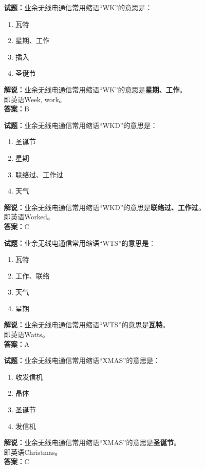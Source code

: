 \documentclass{ctexbook}
\begin{document}
\bigskip


\noindent\textbf{试题：}业余无线电通信常用缩语“WK”的意思是：
\begin{enumerate}[leftmargin=3em]
\item 瓦特
\item 星期、工作
\item 插入
\item 圣诞节
\end{enumerate}
\noindent\textbf{解说：}业余无线电通信常用缩语“WK”的意思是\textbf{星期、工作}。\\即英语Week, work。\\\noindent\textbf{答案：}B


\bigskip


\noindent\textbf{试题：}业余无线电通信常用缩语“WKD”的意思是：
\begin{enumerate}[leftmargin=3em]
\item 圣诞节
\item 星期
\item 联络过、工作过
\item 天气
\end{enumerate}
\noindent\textbf{解说：}业余无线电通信常用缩语“WKD”的意思是\textbf{联络过、工作过}。\\即英语Worked。\\\noindent\textbf{答案：}C



\bigskip


\noindent\textbf{试题：}业余无线电通信常用缩语“WTS”的意思是：
\begin{enumerate}[leftmargin=3em]
\item 瓦特
\item 工作、联络
\item 天气
\item 星期
\end{enumerate}
\noindent\textbf{解说：}业余无线电通信常用缩语“WTS”的意思是\textbf{瓦特}。\\即英语Watts。\\\noindent\textbf{答案：}A


\bigskip


\noindent\textbf{试题：}业余无线电通信常用缩语“XMAS”的意思是：
\begin{enumerate}[leftmargin=3em]
\item 收发信机
\item 晶体
\item 圣诞节
\item 发信机
\end{enumerate}
\noindent\textbf{解说：}业余无线电通信常用缩语“XMAS”的意思是\textbf{圣诞节}。\\即英语Christmas。\\\noindent\textbf{答案：}C
\end{document}

